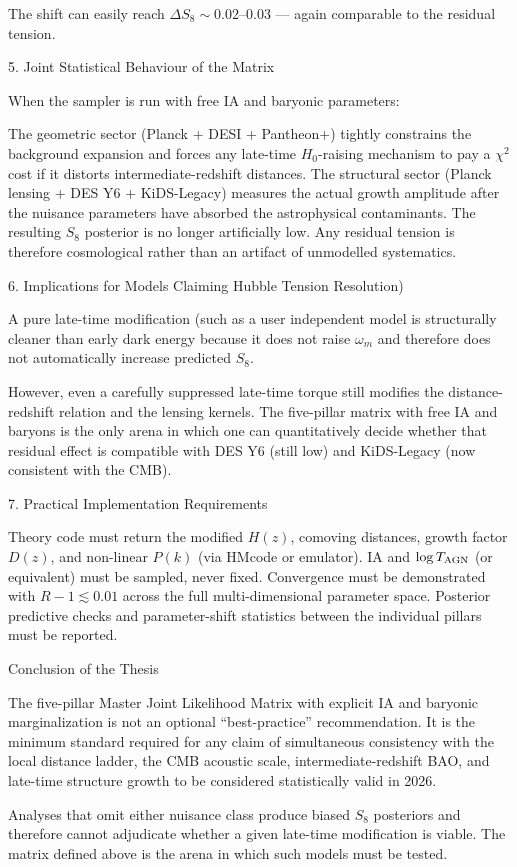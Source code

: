 The shift can easily reach \(\Delta S_8\sim 0.02\)–0.03 — again comparable to the residual tension.

5. Joint Statistical Behaviour of the Matrix

When the sampler is run with free IA and baryonic parameters:

The geometric sector (Planck + DESI + Pantheon+) tightly constrains the background expansion and forces any late-time \(H_0\)-raising mechanism to pay a \(\chi^2\) cost if it distorts intermediate-redshift distances.
The structural sector (Planck lensing + DES Y6 + KiDS-Legacy) measures the actual growth amplitude after the nuisance parameters have absorbed the astrophysical contaminants.
The resulting \(S_8\) posterior is no longer artificially low. Any residual tension is therefore cosmological rather than an artifact of unmodelled systematics.

6. Implications for Models Claiming Hubble Tension Resolution)

A pure late-time modification (such as a user independent model is structurally cleaner than early dark energy because it does not raise \(\omega_m\) and therefore does not automatically increase predicted \(S_8\).  

However, even a carefully suppressed late-time torque still modifies the distance-redshift relation and the lensing kernels. The five-pillar matrix with free IA and baryons is the only arena in which one can quantitatively decide whether that residual effect is compatible with DES Y6 (still low) and KiDS-Legacy (now consistent with the CMB).

7. Practical Implementation Requirements

Theory code must return the modified \(H(z)\), comoving distances, growth factor \(D(z)\), and non-linear \(P(k)\) (via HMcode or emulator).
IA and \(\log T_{\rm AGN}\) (or equivalent) must be sampled, never fixed.
Convergence must be demonstrated with \(R-1\lesssim 0.01\) across the full multi-dimensional parameter space.
Posterior predictive checks and parameter-shift statistics between the individual pillars must be reported.

Conclusion of the Thesis

The five-pillar Master Joint Likelihood Matrix with explicit IA and baryonic marginalization is not an optional “best-practice” recommendation. It is the minimum standard required for any claim of simultaneous consistency with the local distance ladder, the CMB acoustic scale, intermediate-redshift BAO, and late-time structure growth to be considered statistically valid in 2026.  

Analyses that omit either nuisance class produce biased \(S_8\) posteriors and therefore cannot adjudicate whether a given late-time modification is viable. The matrix defined above is the arena in which such models must be tested.
